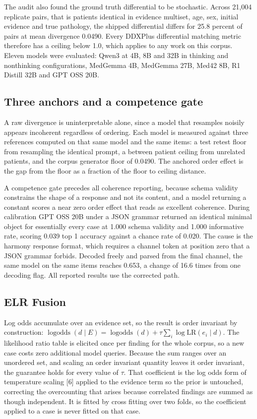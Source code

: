 \documentclass[10pt]{article}
\begin{document}
The audit also found the ground truth differential to be stochastic. Across 21{,}004 replicate
pairs, that is patients identical in evidence multiset, age, sex, initial evidence and true
pathology, the shipped differential differs for 25.8 percent of pairs at mean divergence 0.0490.
Every DDXPlus differential matching metric therefore has a ceiling below 1.0, which applies to any
work on this corpus. Eleven models were evaluated: Qwen3 at 4B, 8B and 32B in thinking and
nonthinking configurations, MedGemma 4B, MedGemma 27B, Med42 8B, R1 Distill 32B and GPT OSS 20B.

\subsection{Three anchors and a competence gate}
A raw divergence is uninterpretable alone, since a model that resamples noisily appears incoherent
regardless of ordering. Each model is measured against three references computed on that same model
and the same items: a test retest floor from resampling the identical prompt, a between patient
ceiling from unrelated patients, and the corpus generator floor of 0.0490. The anchored order
effect is the gap from the floor as a fraction of the floor to ceiling distance.

A competence gate precedes all coherence reporting, because schema validity constrains the shape of
a response and not its content, and a model returning a constant scores a near zero order effect
that reads as excellent coherence. During calibration GPT OSS 20B under a JSON grammar returned an
identical minimal object for essentially every case at 1.000 schema validity and 1.000 informative
rate, scoring 0.039 top 1 accuracy against a chance rate of 0.020. The cause is the harmony response
format, which requires a channel token at position zero that a JSON grammar forbids. Decoded freely
and parsed from the final channel, the same model on the same items reaches 0.653, a change of 16.6
times from one decoding flag. All reported results use the corrected path.

\subsection{ELR Fusion}
Log odds accumulate over an evidence set, so the result is order invariant by construction:
$\operatorname{logodds}(d \mid E) = \operatorname{logodds}(d) + \tau \sum_{i} \log \mathrm{LR}(e_i \mid d)$.
The likelihood ratio table is elicited once per finding for the whole corpus, so a new case costs
zero additional model queries. Because the sum ranges over an unordered set, and scaling an order
invariant quantity leaves it order invariant, the guarantee holds for every value of $\tau$. That
coefficient is the log odds form of temperature scaling [6] applied to the evidence term so
the prior is untouched, correcting the overcounting that arises because correlated findings are
summed as though independent. It is fitted by cross fitting over two folds, so the coefficient
applied to a case is never fitted on that case.
\end{document}
